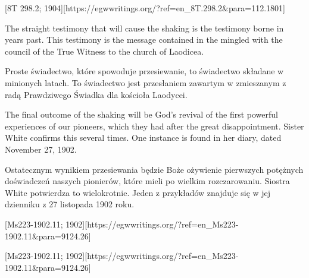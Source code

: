 [8T 298.2; 1904][https://egwwritings.org/?ref=en\_8T.298.2&para=112.1801]


The straight testimony that will cause the shaking is the testimony borne in years past. This testimony is the message contained in the  mingled with the council of the True Witness to the church of Laodicea.


Proste świadectwo, które spowoduje przesiewanie, to świadectwo składane w minionych latach. To świadectwo jest przesłaniem zawartym w  zmieszanym z radą Prawdziwego Świadka dla kościoła Laodycei.


The final outcome of the shaking will be God’s revival of the first powerful experiences of our pioneers, which they had after the great disappointment. Sister White confirms this several times. One instance is found in her diary, dated November 27, 1902.


Ostatecznym wynikiem przesiewania będzie Boże ożywienie pierwszych potężnych doświadczeń naszych pionierów, które mieli po wielkim rozczarowaniu. Siostra White potwierdza to wielokrotnie. Jeden z przykładów znajduje się w jej dzienniku z 27 listopada 1902 roku.


[Ms223-1902.11; 1902][https://egwwritings.org/?ref=en\_Ms223-1902.11&para=9124.26]


[Ms223-1902.11; 1902][https://egwwritings.org/?ref=en\_Ms223-1902.11&para=9124.26]


